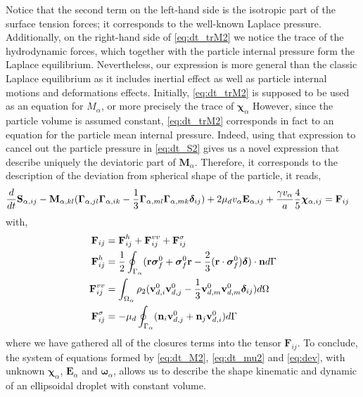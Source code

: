 Notice that the second term on the left-hand side is the isotropic part of the surface tension forces; it corresponds to the well-known Laplace pressure. 
Additionally, on the right-hand side of \ref{eq:dt_trM2} we notice the trace of the hydrodynamic forces, which together with the particle internal pressure form the Laplace equilibrium. 
Nevertheless, our expression is more general than the classic Laplace equilibrium as it includes inertial effect as well as particle internal motions and deformations effects.  
Initially, \ref{eq:dt_trM2} is supposed to be used as an equation for $M_\alpha$, or more precisely the trace of $\bm\chi_\alpha$
However, since the particle volume is assumed constant, \ref{eq:dt_trM2} corresponds in fact to an equation for the particle mean internal pressure. 
Indeed, using that expression to cancel out the particle pressure in \ref{eq:dt_S2} gives us a novel expression that describe uniquely the deviatoric part of $\textbf{M}_\alpha$.
Therefore, it corresponds to the description of the deviation from spherical shape of the particle, it reads, 
\begin{align}
    \frac{d}{dt} \textbf{S}_{\alpha,ij}
    -   \textbf{M}_{\alpha,kl} 
    (\bm\Gamma_{\alpha,jl}\bm\Gamma_{\alpha,ik}  
    - \frac{1}{3}
    \bm\Gamma_{\alpha,ml}\bm\Gamma_{\alpha,mk}  
    \bm\delta_{ij}
    )
    &+ 2 \mu_d v_\alpha \textbf{E}_{\alpha,ij}
    + \frac{\gamma v_\alpha }{a} 
    \frac{4  }{5} \bm\chi_{\alpha,ij}
    = \textbf{F}_{ij}
    \label{eq:dev}
\end{align}
with,
\begin{align}
    \textbf{F}_{ij}
    &= 
    \textbf{F}_{ij}^h
    +\textbf{F}_{ij}^{vv}
    + \textbf{F}_{ij}^{\sigma}\\
    \textbf{F}_{ij}^h
    &= \frac{1}{2}\oint_{\Gamma_{\alpha}} (\textbf{r}\bm\sigma_f^0 + \bm\sigma_f^0\textbf{r} - \frac{2}{3}(\textbf{r}\cdot \bm\sigma_f^0) \bm\delta)\cdot \textbf{n} d\Gamma \\
    \textbf{F}_{ij}^{vv}
    &= \int_{\Omega_{\alpha}} \rho_2 (\textbf{v}_{d,i}^0\textbf{v}_{d,j}^0 - \frac{1}{3}\textbf{v}_{d,m}^0\textbf{v}_{d,m}^0 \bm\delta_{ij})  d\Omega\\
    \textbf{F}_{ij}^{\sigma}
    &= - \mu_d \oint_{\Gamma_{\alpha}} (\textbf{n}_i \textbf{v}_{d,j}^0 + \textbf{n}_j \textbf{v}_{d,i}^0) d\Gamma\nonumber
\end{align}
where we have gathered all of the closures terms into the tensor $\textbf{F}_{ij}$. 
To conclude, the system of equations formed by \ref{eq:dt_M2}, \ref{eq:dt_mu2} and \ref{eq:dev}, with unknown $\bm\chi_\alpha$, $\textbf{E}_\alpha$ and $\bm\omega_\alpha$, allows us to describe the shape kinematic and dynamic of an ellipsoidal droplet with constant volume.


